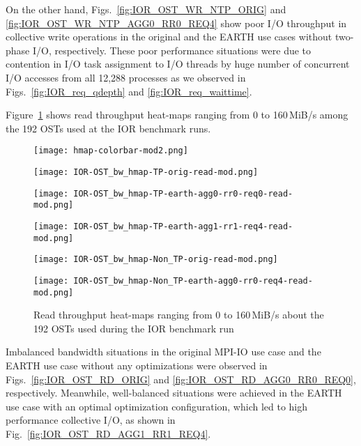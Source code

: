 \documentclass{jhps}
\begin{document}
On the other hand,
Figs.~\ref{fig:IOR_OST_WR_NTP_ORIG} and
\ref{fig:IOR_OST_WR_NTP_AGG0_RR0_REQ4} show poor I/O throughput
in collective write operations in the original and the EARTH use cases
without two-phase I/O, respectively.
These poor performance situations were due to contention
in I/O task assignment to I/O threads by huge number of concurrent I/O accesses
from all 12,288 processes as we observed in
Figs.~\ref{fig:IOR_req_qdepth} and \ref{fig:IOR_req_waittime}.

Figure~\ref{fig:IOR_OST_BW_HMAP_RD} shows read throughput heat-maps
ranging from 0 to 160\,MiB/s among the 192 OSTs used at the IOR benchmark runs.
%
\begin{figure}[tb]
\begin{minipage}[t]{0.06\textwidth}
 \texttt{[image: hmap-colorbar-mod2.png]}
\end{minipage}
%
\noindent
\begin{minipage}[t]{0.3\textwidth}
 \centering
 \texttt{[image: IOR-OST\_bw\_hmap-TP-orig-read-mod.png]}
 \label{fig:IOR_OST_RD_ORIG}
\end{minipage}
%
\noindent
\begin{minipage}[t]{0.3\textwidth}
 \centering
 \texttt{[image: IOR-OST\_bw\_hmap-TP-earth-agg0-rr0-req0-read-mod.png]}
 \label{fig:IOR_OST_RD_AGG0_RR0_REQ0}
\end{minipage}
%
\noindent
\begin{minipage}[t]{0.3\textwidth}
 \centering
 \texttt{[image: IOR-OST\_bw\_hmap-TP-earth-agg1-rr1-req4-read-mod.png]}
 \label{fig:IOR_OST_RD_AGG1_RR1_REQ4}
\end{minipage}
%
\begin{minipage}[t]{0.3\textwidth}
 \centering
 \texttt{[image: IOR-OST\_bw\_hmap-Non\_TP-orig-read-mod.png]}
 \label{fig:IOR_OST_RD_NTP_ORIG}
\end{minipage}
%
\begin{minipage}[t]{0.3\textwidth}
 \centering
 \texttt{[image: IOR-OST\_bw\_hmap-Non\_TP-earth-agg0-rr0-req4-read-mod.png]}
 \label{fig:IOR_OST_RD_NTP_AGG0_RR0_REQ4}
\end{minipage}
%
\caption{Read throughput heat-maps ranging from 0 to 160\,MiB/s
about the 192 OSTs used during the IOR benchmark run}
\label{fig:IOR_OST_BW_HMAP_RD}
\end{figure}
%
Imbalanced bandwidth situations in the original MPI-IO use case
and the EARTH use case without any optimizations were observed
in Figs.~\ref{fig:IOR_OST_RD_ORIG} and \ref{fig:IOR_OST_RD_AGG0_RR0_REQ0}, respectively.
Meanwhile, well-balanced situations were achieved in the EARTH use case
with an optimal optimization configuration,
which led to high performance collective I/O,
as shown in Fig.~\ref{fig:IOR_OST_RD_AGG1_RR1_REQ4}.
\end{document}
